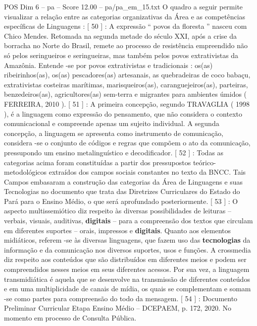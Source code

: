 \begin{textsample}{POS Dim 6 – pa – Score 12.00 – pa/pa\_em\_15.txt}
O quadro a seguir permite visualizar a relação entre as categorias organizativas da Área e as competências específicas de Linguagens : [ 50 ] : A expressão “ povos da floresta ” nasceu com Chico Mendes.
Retomada na segunda metade do século XXI, após a crise da borracha no Norte do Brasil, remete ao processo de resistência empreendido não só pelos seringueiros e seringueiras, mas também pelos povos extrativistas da Amazônia.
Entende -se por povos extrativistas e tradicionais : os(as) ribeirinhos(as), os(as) pescadores(as) artesanais, as quebradeiras de coco babaçu, extrativistas costeiras marítimas, marisqueiros(as), caranguejeiros(as), parteiras, benzedeiros(as), agricultores(as) sem-terra e migrantes para ambientes úmidos ( FERREIRA, 2010 ). [ 51 ] : A primeira concepção, segundo TRAVAGLIA ( 1998 ), é a linguagem como expressão do pensamento, que não considera o contexto comunicacional e compreende apenas um sujeito individual.
A segunda concepção, a linguagem se apresenta como instrumento de comunicação, considera -se o conjunto de códigos e regras que compõem o ato da comunicação, pressupondo um ensino metalinguístico e decodificador. [ 52 ] : Todas as categorias acima foram constituídas a partir dos pressupostos teórico-metodológicos extraídos dos campos sociais constantes no texto da BNCC.
Tais Campos embasaram a construção das categorias da Área de Linguagens e suas Tecnologias no documento que trata das Diretrizes Curriculares do Estado do Pará para o Ensino Médio, o que será aprofundado posteriormente. [ 53 ] : O aspecto multissemiótico diz respeito às diversas possibilidades de leituras – verbais, visuais, auditivas, \textbf{digitais} – para a compreensão dos textos que circulam em diferentes suportes – orais, impressos e \textbf{digitais}.
Quanto aos elementos midiáticos, referem -se às diversas linguagens, que fazem uso das \textbf{tecnologias} da informação e da comunicação nos diversos suportes, usos e funções.
A crossmedia diz respeito aos conteúdos que são distribuídos em diferentes meios e podem ser compreendidos nesses meios em seus diferentes acessos.
Por sua vez, a linguagem transmidiática é aquela que se desenvolve na transmissão de diferentes conteúdos e em uma multiplicidade de canais de mídia, os quais se complementam e somam -se como partes para compreensão do todo da mensagem. [ 54 ] : Documento Preliminar Curricular Etapa Ensino Médio – DCEPAEM, p. 172, 2020.
No momento em processo de Consulta Pública.

\end{textsample}
